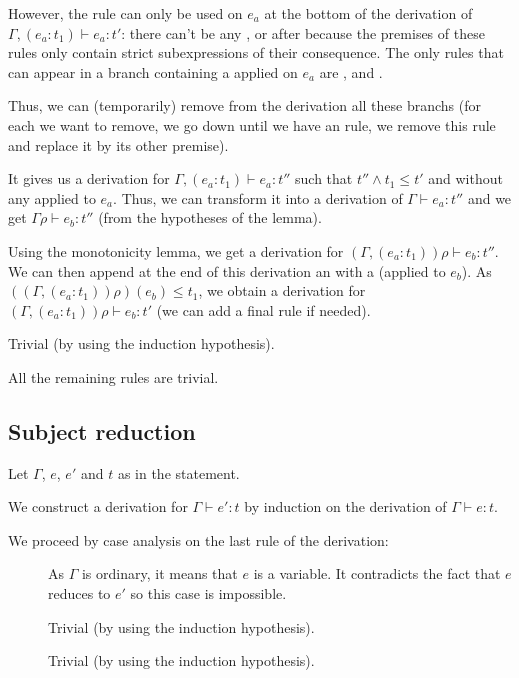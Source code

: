 \documentclass[a4paper]{article}
\theoremstyle{definition}
\begin{document}
\begin{description}
\begin{itemize}
            However, the rule  can only be used on $e_a$ at the bottom of the derivation of $\Gamma,(e_a:t_1) \vdash e_a : t'$:
            there can't be any ,  or  after because the premises of these rules only contain strict subexpressions of their
            consequence. The only rules that can appear in a branch containing a  applied on $e_a$ are ,  and .

            Thus, we can (temporarily) remove from the derivation all these branchs
            (for each  we want to remove, we go down until we have an  rule,
            we remove this  rule and replace it by its other premise).

            It gives us a derivation for $\Gamma,(e_a:t_1) \vdash e_a : t''$ such that $t''\land t_1 \leq t'$ and without any  applied to $e_a$.
            Thus, we can transform it into a derivation of $\Gamma \vdash e_a : t''$ and we get $\Gamma\rho \vdash e_b : t''$ (from the hypotheses of the lemma).

            Using the monotonicity lemma, we get a derivation for $(\Gamma,(e_a:t_1))\rho\vdash e_b : t''$.
            We can then append at the end of this derivation an  with a  (applied to $e_b$).
            As $((\Gamma,(e_a:t_1))\rho)(e_b) \leq t_1$, we obtain a derivation
            for $(\Gamma,(e_a:t_1))\rho\vdash e_b : t'$ (we can add a final  rule if needed).
            
          \end{itemize}

          \item[\Rule{PTypeof}] Trivial (by using the induction hypothesis).
          \item[\Rule{P$\cdots$}] All the remaining rules are trivial.
        \end{description}

        \subsection{Subject reduction}

        Let $\Gamma$, $e$, $e'$ and $t$ as in the statement.

        We construct a derivation for $\Gamma \vdash e':t$ by induction on the derivation of $\Gamma \vdash e:t$.

        We proceed by case analysis on the last rule of the derivation:
        
        \begin{description}
          \item[] As $\Gamma$ is ordinary, it means that $e$ is a variable.
          It contradicts the fact that $e$ reduces to $e'$ so this case is impossible. 
          \item[] Trivial (by using the induction hypothesis).
          \item[] Trivial (by using the induction hypothesis).
        \end{description}
\end{document}
